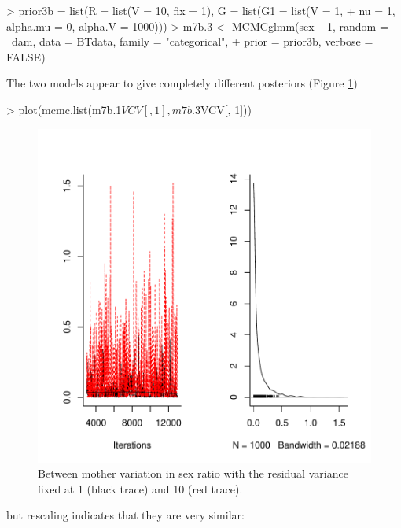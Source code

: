 \documentclass{article}
\begin{document}
\begin{Schunk}
\begin{Sinput}
> prior3b = list(R = list(V = 10, fix = 1), G = list(G1 = list(V = 1, 
+     nu = 1, alpha.mu = 0, alpha.V = 1000)))
> m7b.3 <- MCMCglmm(sex ~ 1, random = ~dam, data = BTdata, family = "categorical", 
+     prior = prior3b, verbose = FALSE)
\end{Sinput}
\end{Schunk}

The two models appear to give completely different posteriors (Figure \ref{sexratio2})

\begin{Schunk}
\begin{Sinput}
> plot(mcmc.list(m7b.1$VCV[, 1], m7b.3$VCV[, 1]))
\end{Sinput}
\end{Schunk}

\begin{figure}[!h]
\begin{center}
\includegraphics{Lecture8-021}
\end{center}
\caption{Between mother variation in sex ratio with the residual variance fixed at 1 (black trace) and 10 (red trace).}
\label{sexratio2}
\end{figure}

but rescaling indicates that they are very similar: 
\end{document}
